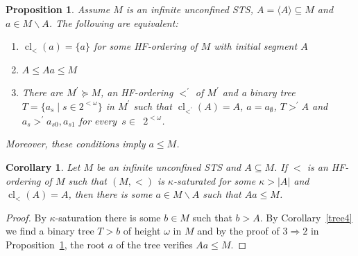 \documentclass[10pt,a4paper]{article}
\DeclareMathOperator{\cl}{cl}
\theoremstyle{note}
\newtheorem{prop}[thm]{Proposition}
\newtheorem{cor}[thm]{Corollary}
\begin{document}
\begin{prop} \label{May_26_2024_1} Assume  $M$ is an infinite unconfined STS, $A=\langle A\rangle \subseteq  M$  and  $a\in M\smallsetminus A$. The following are equivalent:
	\begin{enumerate}
		\item  $\cl_<(a)=\{a\}$ for some HF-ordering of $M$ with initial segment  $A$
		\item   $A\leq Aa\leq M$
		\item There are $M^\prime\succeq M$, an HF-ordering $<^\prime$ of $M^\prime$ and a binary tree $T=\{a_s\mid s\in 2^{<\omega}\}$ in $M^\prime$ such that $\cl_{<^\prime}(A)=A$,  $a=a_\emptyset$, $T>^\prime A$ and  $a_s>^\prime a_{s0},a_{s1}$ for every~$s\in$~$ 2^{<\omega}$.
	\end{enumerate}
	Moreover, these conditions imply $a\leq M$.
\end{prop}

\begin{cor}\label{June_25_2024_4}  Let $M$ be  an infinite unconfined STS  and $A\subseteq M$.  If $<$ is an HF-ordering of $M$ such that $(M,<)$ is  $\kappa$-saturated for some $\kappa>|A|$ and $\cl_<(A)=A$, then there is some $a\in M\smallsetminus A$  such that  $Aa\leq M$.
\end{cor}

\begin{proof}   By $\kappa$-saturation there is some $b\in M$  such that $b>A$. By  Corollary~\ref{tree4} we find a binary tree $T>b$ of height $\omega$ in $M$ and by the proof of $ 3 \Rightarrow 2$ in Proposition~\ref{May_26_2024_1}, the root $a$ of the tree verifies $Aa\leq M$.
\end{proof}
\end{document}
